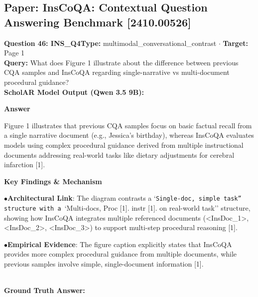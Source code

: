 \documentclass[10pt,a4paper]{article}
\begin{document}
\subsection{Paper: InsCoQA: Contextual Question Answering Benchmark [2410.00526]}
\vspace{-4pt}
\begin{tcolorbox}[questionbox]
{\noindent\bfseries\large\color{navy} Question 46: INS\_Q4}\hfill {\footnotesize\color{darkteal}\textbf{Type:} multimodal\_conversational\_contrast $\cdot$ \textbf{Target:} Page 1}\\[4pt]
{\noindent\bfseries\color{accentblue} Query: } What does Figure 1 illustrate about the difference between previous CQA samples and InsCoQA regarding single-narrative vs multi-document procedural guidance?\\[6pt]
{\noindent\bfseries\color{navy} ScholAR Model Output (Qwen 3.5 9B):}\\[2pt]
{\small \noindent \textbf{Answer}\par\vspace{3pt}Figure 1 illustrates that previous CQA samples focus on basic factual recall from a single narrative document (e.g., Jessica's birthday), whereas InsCoQA evaluates models using complex procedural guidance derived from multiple instructional documents addressing real-world tasks like dietary adjustments for cerebral infarction [1].\par\vspace{3pt}\noindent \textbf{Key Findings \& Mechanism}\par\vspace{3pt}\noindent\hspace*{8pt}$\bullet$\hspace*{4pt}\textbf{Architectural Link}: The diagram contrasts a `\texttt{Single-doc, simple task'' structure with a }`Multi-docs, Proc [1]. instr [1]. on real-world task'' structure, showing how InsCoQA integrates multiple referenced documents (<InsDoc\_1>, <InsDoc\_2>, <InsDoc\_3>) to support multi-step procedural reasoning [1].\par\vspace{3pt}\noindent\hspace*{8pt}$\bullet$\hspace*{4pt}\textbf{Empirical Evidence}: The figure caption explicitly states that InsCoQA provides more complex procedural guidance from multiple documents, while previous samples involve simple, single-document information [1].}\\[6pt]
{\noindent\bfseries\color{darkteal} Ground Truth Answer:}\\[2pt]

\end{tcolorbox}
\end{document}
